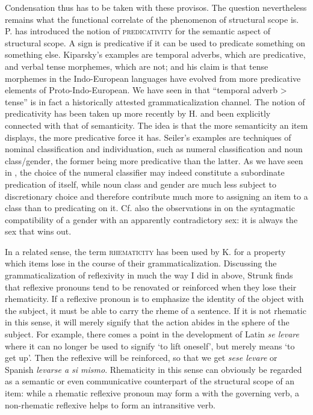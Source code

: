 Condensation thus has to be taken with these provisos. The question nevertheless remains what the functional correlate of the phenomenon of structural scope is. P. \citet{Kiparsky1968} has introduced the notion of \textsc{predicativity} for the semantic aspect of structural scope. A sign is predicative if it can be used to predicate something on something else. Kiparsky's examples are temporal adverbs, which are predicative, and verbal tense morphemes, which are not; and his claim is that tense morphemes in the Indo-European languages have evolved from more predicative elements of Proto-Indo-European. We have seen in  that ``temporal adverb {\textgreater} tense'' is in fact a historically attested grammaticalization channel. The notion of predicativity has been taken up more recently by H. \citet{Seiler1982} and been explicitly connected with that of semanticity. The idea is that the more semanticity an item displays, the more predicative force it has. Seiler's examples are techniques of nominal classification and individuation, such as numeral classification and noun class/gender, the former being more predicative than the latter. As we have seen in , the choice of the numeral classifier may indeed constitute a subordinate predication of itself, while noun class and gender are much less subject to discretionary choice and therefore contribute much more to assigning an item to a class than to predicating on it. Cf. also the observations in  on the syntagmatic compatibility of a gender with an apparently contradictory sex: it is always the sex that wins out.

In a related sense, the term \textsc{rhematicity} has been used by K. \citet{Strunk1980} for a property which items lose in the course of their grammaticalization. Discussing the grammaticalization of reflexivity in much the way I did in  above, Strunk finds that reflexive pronouns tend to be renovated or reinforced when they lose their rhematicity. If a reflexive pronoun is to emphasize the identity of the object with the subject, it must be able to carry the rheme of a sentence. If it is not rhematic in this sense, it will merely signify that the action abides in the sphere of the subject. For example, there comes a point in the development of Latin \textit{se levare} where it can no longer be used to signify ‘to lift oneself’, but merely means ‘to get up’. Then the reflexive will be reinforced, so that we get \textit{sese levare} or Spanish \textit{levarse a si mismo}. Rhematicity in this sense can obviously be regarded as a semantic or even communicative counterpart of the structural scope of an item: while a rhematic reflexive pronoun may form a \vp with the governing verb, a non-rhematic reflexive helps to form an intransitive verb.

